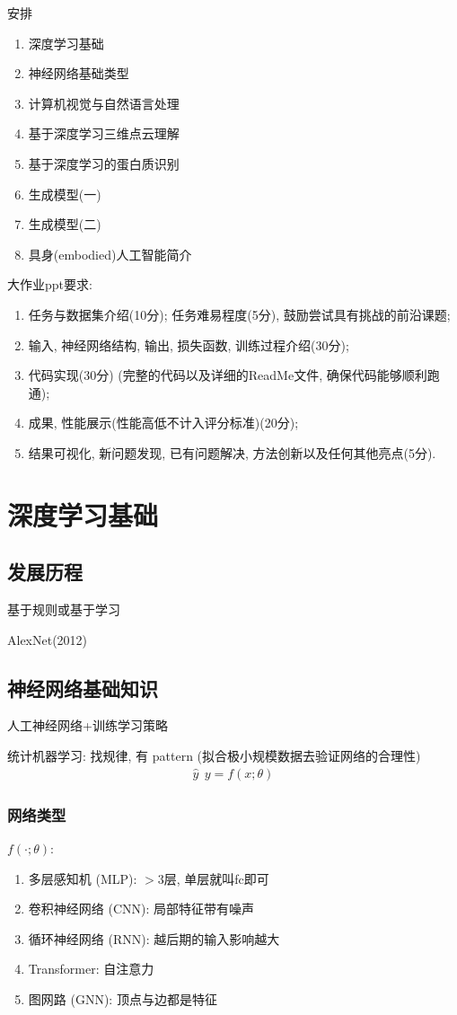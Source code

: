 \newpage
安排
\begin{enumerate}
    \item 深度学习基础
    \item 神经网络基础类型
    \item 计算机视觉与自然语言处理
    \item 基于深度学习三维点云理解
    \item 基于深度学习的蛋白质识别
    \item 生成模型(一)
    \item 生成模型(二)
    \item 具身(embodied)人工智能简介
\end{enumerate}

大作业ppt要求:
\begin{enumerate}\small
    \item 	任务与数据集介绍(10分); 任务难易程度(5分), 鼓励尝试具有挑战的前沿课题; 
    \item 输入, 神经网络结构, 输出, 损失函数, 训练过程介绍(30分); 
    \item 代码实现(30分) (完整的代码以及详细的ReadMe文件, 确保代码能够顺利跑通); 
    \item 成果, 性能展示(性能高低不计入评分标准)(20分); 
    \item 结果可视化, 新问题发现, 已有问题解决, 方法创新以及任何其他亮点(5分).     
\end{enumerate}

\section{深度学习基础}

\subsection{发展历程}
基于规则或基于学习 

AlexNet(2012)

\subsection{神经网络基础知识}
人工神经网络+训练学习策略

统计机器学习: 找规律, 有 pattern (拟合极小规模数据去验证网络的合理性)
\begin{align*}
    \hat{y}\ \ y=f(x;\theta)
\end{align*}

\subsubsection{网络类型}
$f(\cdot; \theta)$:
\begin{enumerate}
    \item 多层感知机 (MLP): $>3$层, 单层就叫fc即可
    \item 卷积神经网络 (CNN): 局部特征带有噪声
    \item 循环神经网络 (RNN): 越后期的输入影响越大
    \item Transformer: 自注意力 %
    \item 图网路 (GNN): 顶点与边都是特征
\end{enumerate}

